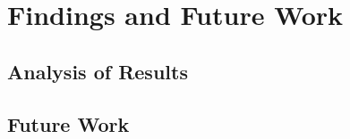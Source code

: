 \section{Findings and Future Work}
\label{sec:relwork}

\subsection{Analysis of Results}

\subsection{Future Work}
